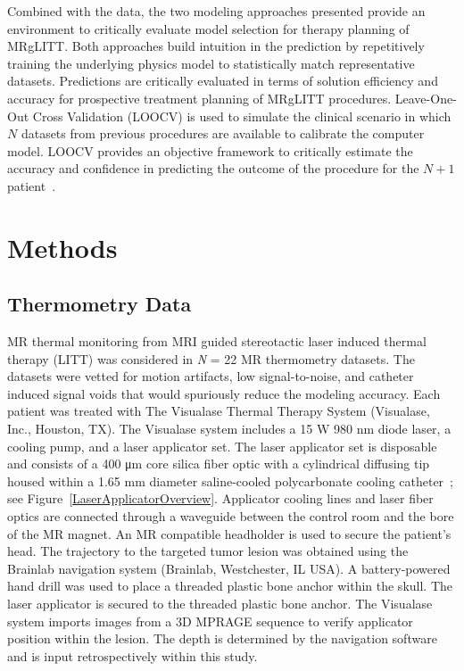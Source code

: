 \documentclass[12pt]{article}
\newcommand{\numberofpatientsLOOCV}{22 }
\begin{document}
Combined with the data, the two modeling approaches presented provide an
environment to critically evaluate model selection for therapy planning of MRgLITT. 
Both approaches 
build intuition in the prediction by
repetitively training the underlying physics model 
to statistically match representative datasets. 
Predictions are critically evaluated in terms of solution efficiency and
accuracy for prospective treatment planning of MRgLITT procedures. 
Leave-One-Out Cross Validation (LOOCV) is used to simulate the clinical
scenario in which $N$ datasets from previous procedures are available to
calibrate the computer model. LOOCV provides an objective framework to
critically estimate the accuracy and confidence in predicting the outcome
of the procedure for the $N+1$ patient~\cite{Stone1974,Geisser1975,Kohavi1995,Browne2000,Arlot2010}.

\section{Methods }
\subsection{Thermometry Data }\label{ThermometryData}

MR thermal monitoring from MRI guided stereotactic laser induced thermal
therapy (LITT) was considered in \textit{N} = \numberofpatientsLOOCV MR thermometry datasets.
The datasets were vetted for motion artifacts, low signal-to-noise, 
and catheter induced signal voids that would
spuriously reduce the modeling accuracy.
Each patient was treated with The Visualase Thermal Therapy System
(Visualase, Inc., Houston, TX).  The Visualase\textsuperscript{\textregistered}
system includes a 15 W
980 nm diode laser, a cooling pump, and a laser applicator set.
The laser applicator set is disposable and consists of 
a 400 \si{\micro\metre} core silica fiber optic with a cylindrical diffusing tip
housed within a 1.65 \si{\milli\metre} diameter saline-cooled polycarbonate cooling 
catheter~\cite{torres2013stereotactic,mcnichols2004technical}; see
Figure~\ref{LaserApplicatorOverview}.
Applicator cooling lines and laser fiber optics are connected through a
waveguide between the control room and the bore of the MR magnet. 
An MR compatible headholder is used to secure the patient's head.
The trajectory to the targeted tumor lesion was obtained 
using the Brainlab navigation system (Brainlab, Westchester, IL USA). 
A battery-powered hand drill was used to place
a threaded plastic bone anchor within the skull.
The laser applicator is secured to the threaded plastic bone anchor.
The Visualase\textsuperscript{\textregistered} system imports images from a 3D MPRAGE sequence
to verify applicator position within the lesion. 
The depth is determined by the navigation software and is input retrospectively
within this study. 
\end{document}
